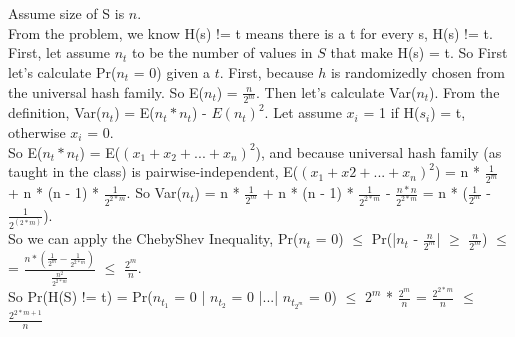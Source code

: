 \documentclass[11pt]{article}
\begin{document}
\part{}
Assume size of S is $n$. \\
From the problem, we know H(s) != t means there is a t for every s, H(s) != t. First, let assume $n_{t}$ to be the number of values in $S$ that make H(s) = t. So First let's calculate Pr($n_{t}$ = 0) given a $t$. First, because $h$ is randomizedly chosen from the universal hash family. So E($n_{t}$) = $\frac{n}{2^{m}}$. Then let's calculate Var($n_{t}$). From the definition, Var($n_{t}$) = E($n_{t}*n_{t}$) - $E(n_{t})^{2}$. Let assume $x_{i}$ = 1 if H($s_{i}$) = t, otherwise $x_{i}$ = 0. \\
So E($n_{t}*n_{t}$) = E($(x_{1} + x_{2} + ... + x_{n})^{2}$), and because universal hash family (as taught in the class) is pairwise-independent, E($(x_{1} + x{2} + ... + x_{n})^{2}$) = n * $\frac{1}{2^{m}}$ + n * (n - 1) * $\frac{1}{2^{2*m}}$. So Var($n_{t}$) = n * $\frac{1}{2^{m}}$ + n * (n - 1) * $\frac{1}{2^{2*m}}$ - $\frac{n * n}{2^{2 * m}}$ = n * ($\frac{1}{2^{m}}$ - $\frac{1}{2^(2*m)}$). \\ 
So we can apply the ChebyShev Inequality, Pr($n_{t}$ = 0) $\leq$ Pr(|$n_{t}$ - $\frac{n}{2^{m}}$| $\geq$ $\frac{n}{2^{m}}$) $\leq$ = $\frac{n * (\frac{1}{2^{m}} - \frac{1}{2^{2*m}})}{\frac{n^{2}}{2^{2*m}}}$ $\leq$ $\frac{2^{m}}{n}$. \\

So Pr(H(S) != t) = Pr($n_{t_{1}}$ = 0 | $n_{t_{2}}$ = 0 |...| $n_{t_{2^{m}}}$ = 0) $\leq$ $2^{m}$ * $\frac{2^{m}}{n}$ = $\frac{2^{2*m}}{n}$ $\leq$ $\frac{2^{2*m+1}}{n}$ 
\end{document}
